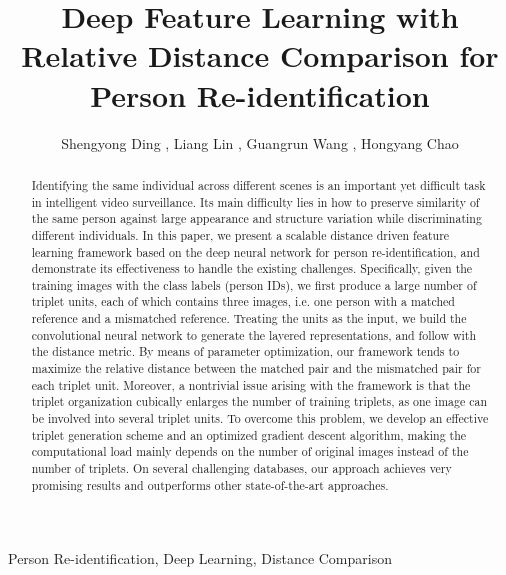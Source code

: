 \documentclass[review]{elsarticle}
\begin{document}
\begin{frontmatter}

\title{Deep Feature Learning with Relative Distance Comparison for Person Re-identification}


\author{\begin{small}Shengyong Ding , Liang Lin , Guangrun Wang , Hongyang Chao \end{small}}
\address{Sun Yat-sen University, Guangzhou 510006, China}









\begin{abstract}
Identifying the same individual across different scenes is an important yet difficult task in intelligent video surveillance. Its main difficulty lies in how to preserve similarity of the same person against large appearance and structure variation while discriminating different individuals. In this paper, we present a scalable distance driven   feature learning framework based on the deep neural network for person re-identification, and demonstrate its effectiveness to handle the existing challenges. Specifically, given the training images with the class labels (person IDs), we first produce a large number of triplet units, each of which contains three images, i.e. one person with a matched reference and a mismatched reference. Treating the units as the input, we build the convolutional neural network to generate the layered representations, and follow with the  distance metric. By means of parameter optimization, our framework tends to maximize the relative distance between the matched pair and the mismatched pair for each triplet unit. Moreover, a nontrivial issue arising with the framework is that the triplet organization cubically enlarges the number of training triplets, as one image can be involved into several triplet units. To overcome this problem, we develop an effective triplet generation scheme and an optimized gradient descent algorithm, making the computational load mainly depends on the number of original images instead of the number of triplets. On several challenging databases, our approach achieves very promising results and outperforms other state-of-the-art approaches.
\end{abstract}

\begin{keyword}
Person Re-identification, Deep Learning, Distance Comparison
\end{keyword}

\end{frontmatter}
\end{document}
